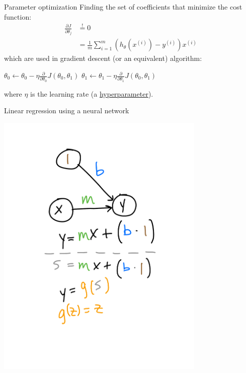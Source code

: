 \documentclass[xetex,compress]{beamer}
\begin{document}
\begin{frame}{Parameter optimization}
  Finding the set of coefficients that minimize the cost function:
  \begin{align*}
    \frac{\partial J}{\partial \theta_{j}} &\overset{!}{=} 0 \\
    &= \frac{1}{m} \sum_{i=1}^{m} \left( h_{\theta}(x^{(i)}) - y^{(i)} \right) x^{(i)}
  \end{align*}
  which are used in gradient descent (or an equivalent) algorithm:
  \begin{algorithmic}[1]
    \Repeat
    \State \( \theta_{0} \gets \theta_{0} - \eta \frac{\partial}{\partial \theta_{0}} J(\theta_{0},\theta_{1}) \)
    \State \( \theta_{1} \gets \theta_{1} - \eta \frac{\partial}{\partial \theta_{1}} J(\theta_{0},\theta_{1}) \)
  \end{algorithmic}
  where \(\eta\) is the learning rate (a \underline{hyperparameter}).
\end{frame}

\begin{frame}{Linear regression using a neural network}
  \begin{center}
    \includegraphics[width=0.75\textwidth]{./figures/lr_nn_1.pdf}
  \end{center}
\end{frame}
\end{document}
